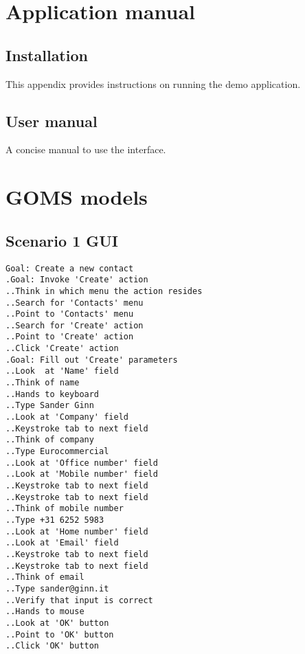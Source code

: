 \appendix
\chapter{Application manual}
\label{appendix:applicationmanual}

\section{Installation}
\label{section:installation}
This appendix provides instructions on running the demo application.

\section{User manual}
\label{section:usermanual}
A concise manual to use the interface.

\chapter{GOMS models}
\label{appendix:gomsmodels}

\section{Scenario 1 GUI}
\label{section:scenario1gui}
\begin{verbatim}
Goal: Create a new contact 
.Goal: Invoke 'Create' action
..Think in which menu the action resides
..Search for 'Contacts' menu
..Point to 'Contacts' menu
..Search for 'Create' action
..Point to 'Create' action
..Click 'Create' action
.Goal: Fill out 'Create' parameters
..Look  at 'Name' field
..Think of name
..Hands to keyboard
..Type Sander Ginn
..Look at 'Company' field
..Keystroke tab to next field
..Think of company
..Type Eurocommercial
..Look at 'Office number' field
..Look at 'Mobile number' field
..Keystroke tab to next field
..Keystroke tab to next field
..Think of mobile number
..Type +31 6252 5983
..Look at 'Home number' field
..Look at 'Email' field
..Keystroke tab to next field
..Keystroke tab to next field
..Think of email
..Type sander@ginn.it
..Verify that input is correct
..Hands to mouse
..Look at 'OK' button
..Point to 'OK' button
..Click 'OK' button
\end{verbatim}

